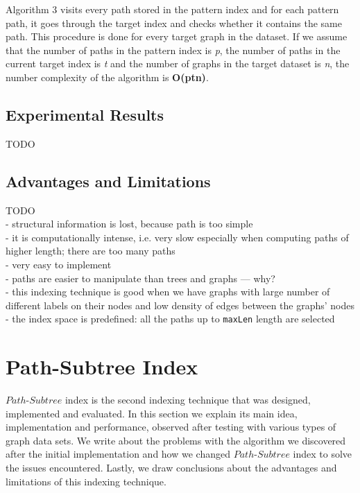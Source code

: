 \documentclass{l4proj}
\theoremstyle{definition}
\begin{document}
Algorithm 3 visits every path stored in the pattern index and for each pattern path, it goes through the target index and checks whether it contains the same path. This procedure is done for every target graph in the dataset. If we assume that the number of paths in the pattern index is \textit{p}, the number of paths in the current target index is \textit{t} and the number of graphs in the target dataset is \textit{n}, the number complexity of the algorithm is \textbf{O(ptn)}.\par
\subsection{Experimental Results}
\label{path-index:experimental-results}
TODO


\subsection{Advantages and Limitations}
\label{path-index:advantages-limitations}
    TODO\\
    - structural information is lost, because path is too simple\\
	- it is computationally intense, i.e. very slow especially when computing paths of higher length; there are too many paths\\
    - very easy to implement\\
    - paths are easier to manipulate than trees and graphs --- why?\\
    - this indexing technique is good when we have graphs with large number of different labels on their nodes and low density of edges between the graphs' nodes\\
    - the index space is predefined: all the paths up to \texttt{maxLen} length are selected\\
\section{Path-Subtree Index}
\label{path-subtree-index}
  $Path$-$Subtree$ index is the second indexing technique that was designed, implemented and evaluated. In this section we explain its main idea, implementation and performance, observed after testing with various types of graph data sets. We write about the problems with the algorithm we discovered after the initial implementation and how we changed $Path$-$Subtree$ index to solve the issues encountered. Lastly, we draw conclusions about the advantages and limitations of this indexing technique.  
\end{document}
